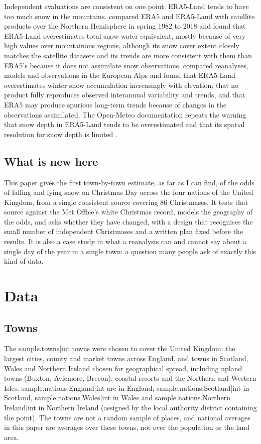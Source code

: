\documentclass[11pt,a4paper]{article}
\begin{document}
Independent evaluations are consistent on one point: ERA5-Land tends to have too much snow in the mountains. \citet{kouki2023} compared ERA5 and ERA5-Land with satellite products over the Northern Hemisphere in spring 1982 to 2018 and found that ERA5-Land overestimates total snow water equivalent, mostly because of very high values over mountainous regions, although its snow cover extent closely matches the satellite datasets and its trends are more consistent with them than ERA5's because it does not assimilate snow observations. \citet{monteiro2023} compared reanalyses, models and observations in the European Alps and found that ERA5-Land overestimates winter snow accumulation increasingly with elevation, that no product fully reproduces observed interannual variability and trends, and that ERA5 may produce spurious long-term trends because of changes in the observations assimilated. The Open-Meteo documentation repeats the warning that snow depth in ERA5-Land tends to be overestimated and that its spatial resolution for snow depth is limited \citep{zippenfenig2023}.

\subsection{What is new here}
This paper gives the first town-by-town estimate, as far as I can find, of the odds of falling and lying snow on Christmas Day across the four nations of the United Kingdom, from a single consistent source covering 86 Christmases. It tests that source against the Met Office's white Christmas record, models the geography of the odds, and asks whether they have changed, with a design that recognises the small number of independent Christmases and a written plan fixed before the results. It is also a case study in what a reanalysis can and cannot say about a single day of the year in a single town: a question many people ask of exactly this kind of data.

\section{Data}\label{sec:data}
\subsection{Towns}
The {{sample.towns|int}} towns were chosen to cover the United Kingdom: the largest cities, county and market towns across England, and towns in Scotland, Wales and Northern Ireland chosen for geographical spread, including upland towns (Buxton, Aviemore, Brecon), coastal resorts and the Northern and Western Isles. {{sample.nations.England|int}} are in England, {{sample.nations.Scotland|int}} in Scotland, {{sample.nations.Wales|int}} in Wales and {{sample.nations.Northern Ireland|int}} in Northern Ireland (assigned by the local authority district containing the point). The towns are not a random sample of places, and national averages in this paper are averages over these towns, not over the population or the land area.
\end{document}
